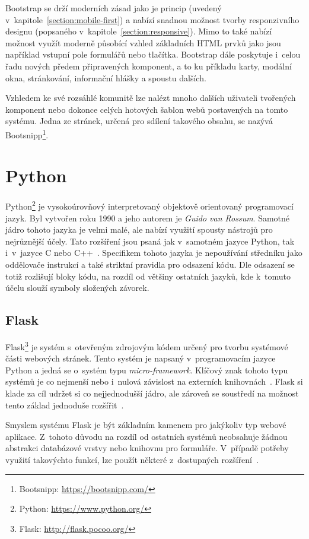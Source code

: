 Bootstrap se drží moderních zásad jako je princip  (uvedený v~kapitole~\ref{section:mobile-first}) a nabízí snadnou možnost tvorby responzivního designu (popsaného v~kapitole~\ref{section:responsive}). Mimo to také nabízí možnost využít moderně působící vzhled základních HTML prvků jako jsou například vstupní pole formulářů nebo tlačítka. Bootstrap dále poskytuje i~celou řadu nových předem připravených komponent, a to ku příkladu karty, modální okna, stránkování, informační hlášky a spoustu dalších.

Vzhledem ke své rozsáhlé komunitě lze nalézt mnoho dalších uživateli tvořených komponent nebo dokonce celých hotových šablon webů postavených na tomto systému. Jedna ze stránek, určená pro sdílení takového obsahu, se nazývá Bootsnipp\footnote{Bootsnipp: \url{https://bootsnipp.com/}}.



\section{Python}
Python\footnote{Python: \url{https://www.python.org/}} je vysokoúrovňový interpretovaný objektově orientovaný programovací jazyk. Byl vytvořen roku 1990 a jeho autorem je \emph{Guido van Rossum}. Samotné jádro tohoto jazyka je velmi malé, ale nabízí využití spousty nástrojů pro nejrůznější účely. Tato rozšíření jsou psaná jak v~samotném jazyce Python, tak i~v~jazyce C nebo C++~\cite{bib:python}. Specifikem tohoto jazyka je nepoužívání středníku jako oddělovače instrukcí a také striktní pravidla pro odsazení kódu. Dle odsazení se totiž rozlišují bloky kódu, na rozdíl od většiny ostatních jazyků, kde k~tomuto účelu slouží symboly složených závorek. 


\subsection{Flask}
Flask\footnote{Flask: \url{http://flask.pocoo.org/}} je systém s~otevřeným zdrojovým kódem určený pro tvorbu systémové části webových stránek. Tento systém je napsaný v~programovacím jazyce Python a jedná se o~systém typu \emph{micro-framework}. Klíčový znak tohoto typu systémů je co nejmenší nebo i~nulová závislost na externích knihovnách~\cite{bib:flask-doc}.
Flask si klade za cíl udržet si co nejjednodušší jádro, ale zároveň se soustředí na možnost tento základ jednoduše rozšířit~\cite{bib:flask-pym}.

Smyslem systému Flask je být základním kamenem pro jakýkoliv typ webové aplikace. Z~tohoto důvodu na rozdíl od ostatních systémů neobsahuje žádnou abstrakci databázové vrstvy nebo knihovnu pro formuláře. V~případě potřeby využití takovýchto funkcí, lze použít některé z~dostupných rozšíření~\cite{bib:flask-design}.

